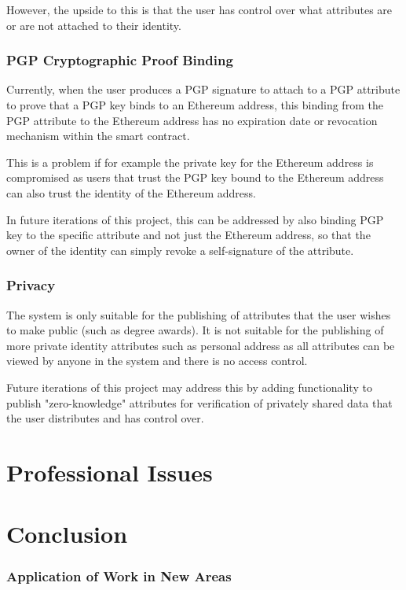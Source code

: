 \documentclass[12pt]{report}
\begin{document}
	However, the upside to this is that the user has control over what attributes are or are not attached to their identity.
	
	\subsection{PGP Cryptographic Proof Binding}
	Currently, when the user produces a PGP signature to attach to a PGP attribute to prove that a PGP key binds to an Ethereum address, this binding from the PGP attribute to the Ethereum address has no expiration date or revocation mechanism within the smart contract.
	
	This is a problem if for example the private key for the Ethereum address is compromised as users that trust the PGP key bound to the Ethereum address can also trust the identity of the Ethereum address.
	
	In future iterations of this project, this can be addressed by also binding PGP key to the specific attribute and not just the Ethereum address, so that the owner of the identity can simply revoke a self-signature of the attribute.
	
	\subsection{Privacy}
	The system is only suitable for the publishing of attributes that the user wishes to make public (such as degree awards). It is not suitable for the publishing of more private identity attributes such as personal address as all attributes can be viewed by anyone in the system and there is no access control.
	
	Future iterations of this project may address this by adding functionality to publish "zero-knowledge" attributes for verification of privately shared data that the user distributes and has control over.
	
	\chapter{Professional Issues}
	
	\chapter{Conclusion}
	\subsection{Application of Work in New Areas}
	
\end{document}
